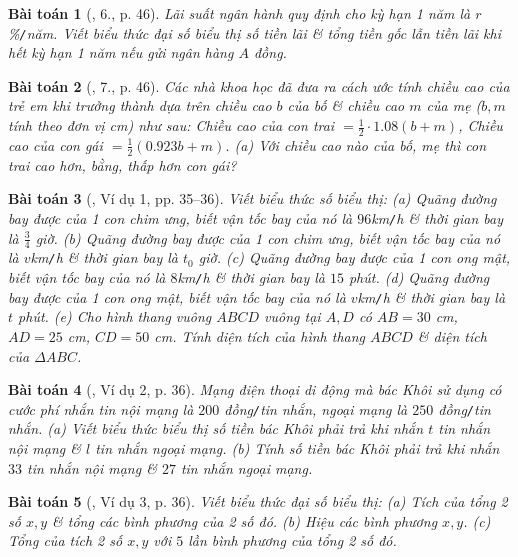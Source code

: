 \documentclass{article}
\newtheorem{baitoan}{Bài toán}
\begin{document}
\begin{baitoan}[\cite{SGK_Toan_7_Canh_Dieu_tap_2}, 6., p. 46]
	Lãi suất ngân hành quy định cho kỳ hạn 1 năm là $r$\%\emph{\texttt{/}}năm. Viết biểu thức đại số biểu thị số tiền lãi \& tổng tiền gốc lẫn tiền lãi khi hết kỳ hạn 1 năm nếu gửi ngân hàng $A$ đồng.
\end{baitoan}

\begin{baitoan}[\cite{SGK_Toan_7_Canh_Dieu_tap_2}, 7., p. 46]
	Các nhà khoa học đã đưa ra cách ước tính chiều cao của trẻ em khi trưởng thành dựa trên chiều cao $b$ của bố \& chiều cao $m$ của mẹ ($b,m$ tính theo đơn vị cm) như sau: Chiều cao của con trai $= \frac{1}{2}\cdot1.08(b + m)$, Chiều cao của con gái $= \frac{1}{2}(0.923b + m)$. (a) Với chiều cao nào của bố, mẹ thì con trai cao hơn, bằng, thấp hơn con gái?
\end{baitoan}

\begin{baitoan}[\cite{SBT_Toan_7_Canh_Dieu_tap_2}, Ví dụ 1, pp. 35--36]
	Viết biểu thức số biểu thị: (a) Quãng đường bay được của 1 con chim ưng, biết vận tốc bay của nó là $96$\emph{km\texttt{/}h} \& thời gian bay là $\frac{3}{4}$ giờ. (b) Quãng đường bay được của 1 con chim ưng, biết vận tốc bay của nó là $v$\emph{km\texttt{/}h} \& thời gian bay là $t_0$ giờ. (c) Quãng đường bay được của 1 con ong mật, biết vận tốc bay của nó là $8$\emph{km\texttt{/}h} \& thời gian bay là $15$ phút. (d) Quãng đường bay được của 1 con ong mật, biết vận tốc bay của nó là $v$\emph{km\texttt{/}h} \& thời gian bay là $t$ phút. (e) Cho hình thang vuông $ABCD$ vuông tại $A,D$ có $AB = 30$ \emph{cm}, $AD = 25$ \emph{cm}, $CD = 50$ \emph{cm}. Tính diện tích của hình thang $ABCD$ \& diện tích của $\Delta ABC$.
\end{baitoan}

\begin{baitoan}[\cite{SBT_Toan_7_Canh_Dieu_tap_2}, Ví dụ 2, p. 36]
	Mạng điện thoại di động mà bác Khôi sử dụng có cước phí nhắn tin nội mạng là $200$ đồng\emph{\texttt{/}}tin nhắn, ngoại mạng là $250$ đồng\emph{\texttt{/}}tin nhắn. (a) Viết biểu thức biểu thị số tiền bác Khôi phải trả khi nhắn $t$ tin nhắn nội mạng \& $l$ tin nhắn ngoại mạng. (b) Tính số tiền bác Khôi phải trả khi nhắn $33$ tin nhắn nội mạng \& $27$ tin nhắn ngoại mạng.
\end{baitoan}

\begin{baitoan}[\cite{SBT_Toan_7_Canh_Dieu_tap_2}, Ví dụ 3, p. 36]
	Viết biểu thức đại số biểu thị: (a) Tích của tổng 2 số $x,y$ \& tổng các bình phương của 2 số đó. (b) Hiệu các bình phương $x,y$. (c) Tổng của tích 2 số $x,y$ với $5$ lần bình phương của tổng 2 số đó.
\end{baitoan}
\end{document}
